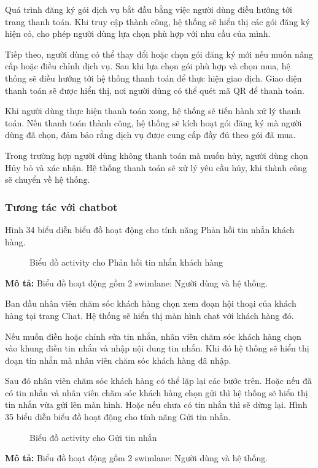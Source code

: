 \par Quá trình đăng ký gói dịch vụ bắt đầu bằng việc người dùng điều hướng tới trang thanh toán. Khi truy cập thành công, hệ thống sẽ hiển thị các gói đăng ký hiện có, cho phép người dùng lựa chọn phù hợp với nhu cầu của mình.

Tiếp theo, người dùng có thể thay đổi hoặc chọn gói đăng ký mới nếu muốn nâng cấp hoặc điều chỉnh dịch vụ. Sau khi lựa chọn gói phù hợp và chọn mua, hệ thống sẽ điều hướng tới hệ thống thanh toán để thực hiện giao dịch. Giao diện thanh toán sẽ được hiển thị, nơi người dùng có thể quét mã QR để thanh toán.

Khi người dùng thực hiện thanh toán xong, hệ thống sẽ tiến hành xử lý thanh toán. Nếu thanh toán thành công, hệ thống sẽ kích hoạt gói đăng ký mà người dùng đã chọn, đảm bảo rằng dịch vụ được cung cấp đầy đủ theo gói đã mua. 

Trong trường hợp người dùng không thanh toán mà muốn hủy, người dùng chọn Hủy bỏ và xác nhận. Hệ thống thanh toán sẽ xử lý yêu cầu hủy, khi thành công sẽ chuyển về hệ thống.


\subsubsection{Tương tác với chatbot}
Hình 34 biểu diễn biểu đồ hoạt động cho tính năng Phản hồi tin nhắn khách hàng.
\begin{figure}[H]
    \centering
     
    \vspace{0.5cm}
    \caption{Biểu đồ activity cho Phản hồi tin nhắn khách hàng}
    \label{fig:enter-label}
\end{figure}
\textbf{Mô tả:}
Biểu đồ hoạt động gồm 2 swimlane: Người dùng và hệ thống.

Ban đầu nhân viên chăm sóc khách hàng chọn xem đoạn hội thoại của khách hàng tại trang Chat. Hệ thống sẽ hiển thị màn hình chat với khách hàng đó.

Nếu muốn điền hoặc chỉnh sửa tin nhắn, nhân viên chăm sóc khách hàng chọn vào khung điền tin nhắn và nhập nội dung tin nhắn. Khi đó hệ thống sẽ hiển thị đoạn tin nhắn mà nhân viên chăm sóc khách hàng đã nhập.
 
Sau đó nhân viên chăm sóc khách hàng có thể lặp lại các bước trên. Hoặc nếu đã có tin nhắn và nhân viên chăm sóc khách hàng chọn gửi thì hệ thống sẽ hiển thị tin nhắn vừa gửi lên màn hình. Hoặc nếu chưa có tin nhắn thì sẽ dừng lại.
Hình 35 biểu diễn biểu đồ hoạt động cho tính năng Gửi tin nhắn.
\begin{figure}[H]
    \centering
     
    \vspace{0.5cm}
    \caption{Biểu đồ activity cho Gửi tin nhắn}
    \label{fig:enter-label}
\end{figure}
\textbf{Mô tả:}
Biểu đồ hoạt động gồm 2 swimlane: Người dùng và hệ thống.


